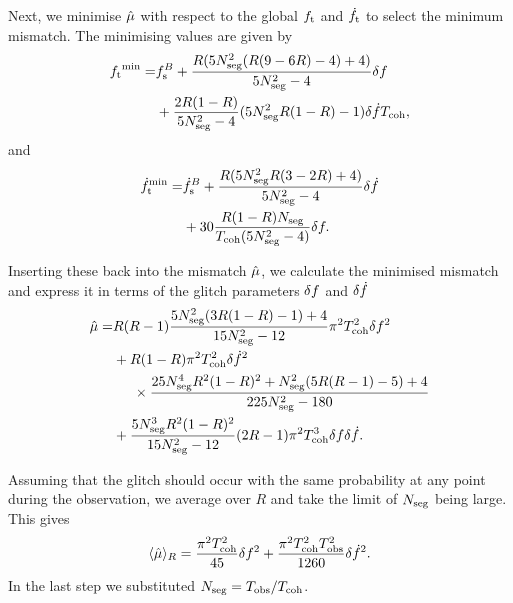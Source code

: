 \documentclass[../full_thesis/full_thesis.tex]{subfiles}
\begin{document}
Next, we minimise $\hat{\mu}$ with respect to the global ${f_{\textrm{t}}}$ and $\dot{f}_{\textrm{t}}$ to
select the minimum mismatch. The minimising values are given by
\begin{align}
\begin{split}
{f_{\textrm{t}}}^{\textrm{min}}  = & f_{\textrm{s}}^{B}
+ \frac{R(5N_{\textrm{seg}}^{2}(R(9-6R)-4) + 4)}{5N_{\textrm{seg}}^{2}-4}\delta f \\
& + \frac{2R(1-R)}{5N_{\textrm{seg}}^{2}-4}(5N_{\textrm{seg}}^{2}R(1-R)-1)\delta\dot{f}T_{\mathrm{coh}},
\end{split}
\end{align}
and
\begin{align}
\begin{split}
\dot{f}_{\textrm{t}}^{\textrm{min}} = & \dot{f}_{\textrm{s}}^{B}
+ \frac{R(5N_{\textrm{seg}}^{2}R(3-2R)+ 4)}{5N_{\textrm{seg}}^{2}-4}\delta\dot{f} \\
& + 30\frac{R(1-R)N_{\textrm{seg}}}{T_{\mathrm{coh}}(5N_{\textrm{seg}}^{2} - 4)}\delta f.
\end{split}
\end{align}

Inserting these back into the mismatch $\hat{\mu}$, we calculate the minimised
mismatch and express it in terms of the glitch parameters $\delta f$ and
$\delta\dot{f}$
\begin{align}
\begin{split}
\hat{\mu} = & R(R-1)\frac{5N_{\textrm{seg}}^{2}(3R(1-R)-1) + 4}{15N_{\textrm{seg}}^{2}-12}\pi^{2}
            T_{\mathrm{coh}}^{2}\delta f^{2} \\
& + R(1-R)\pi^{2}T_{\mathrm{coh}}^{2}\delta\dot{f}^{2} \\
& \hspace{5mm}\times\frac{25N_{\textrm{seg}}^{4}R^{2}(1-R)^{2} + N_{\textrm{seg}}^{2}(5R(R-1)-5) + 4}{225N_{\textrm{seg}}^{2}-180} \\
& + \frac{5N_{\textrm{seg}}^{3}R^{2}(1-R)^{2}}{15N_{\textrm{seg}}^{2}-12}(2R-1)
   \pi^{2}T_{\mathrm{coh}}^{3}\delta f\delta\dot{f}.
\end{split}
\label{eqn: mu semi-coherent R}
\end{align}

Assuming that the glitch should occur with the same probability at any point
during the observation, we average over $R$ and take the limit of $N_{\textrm{seg}}$ being
large. This gives
\begin{align}
\langle\hat{\mu}\rangle_{R} = \frac{\pi^{2}T_{\mathrm{coh}}^{2}}{45}\delta f^{2}
      + \frac{\pi^{2}T_{\mathrm{coh}}^{2}T_{\mathrm{obs}}^{2}}{1260}\delta\dot{f}^{2}.
\label{eqn: R-averaged semi coherent}
\end{align}
In the last step we substituted $N_{\textrm{seg}}=T_{\mathrm{obs}}/T_{\mathrm{coh}}$.
\end{document}
